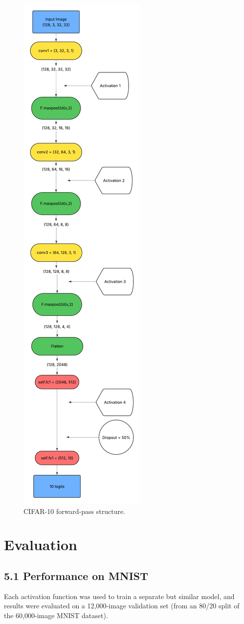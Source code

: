 \documentclass{article}
\begin{document}
\begin{figure}[H]
    \centering
    \includegraphics[width=0.34\linewidth]{cifar_forward_pass.png}
    \caption{CIFAR-10 forward-pass structure.}
    \label{fig:cifar-forward-shift}
\end{figure}



\vspace{1pt}



\section{Evaluation}

\subsection*{5.1 Performance on MNIST}
Each activation function was used to train a separate but similar model, and results were evaluated on a 12,000-image validation set (from an 80/20 split of the 60,000-image MNIST dataset).
\end{document}

